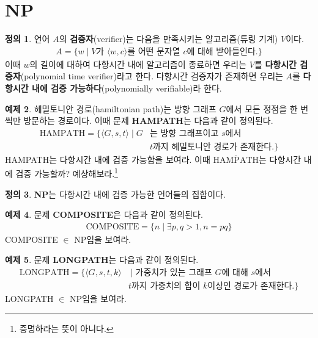 \documentclass[b5paper, 11pt]{book}
\theoremstyle{definition}
\newtheorem{defn}{정의}[chapter]
\newtheorem{ex}[defn]{예제}
\begin{document}
\section{NP}
\begin{defn}
    언어 $A$의 \textbf{검증자}(verifier)는 다음을 만족시키는 알고리즘(튜링 기계) $V$이다.
    \begin{align*}
        A = \{w \;\vert\; V \text{가 } \langle w,c\rangle \text{를 어떤 문자열 } c \text{에 대해 받아들인다.}\}
    \end{align*}
    이때 $w$의 길이에 대하여 다항시간 내에 알고리즘이 종료하면 우리는 $V$를 \textbf{다항시간 검증자}(polynomial time verifier)라고 한다.  다항시간 검증자가 존재하면 우리는 $A$를 \textbf{다항시간 내에 검증 가능하다}(polynomially verifiable)라 한다.
\end{defn}
\begin{ex}
    헤밀토니안 경로(hamiltonian path)는 방향 그래프 $G$에서 모든 정점을 한 번씩만 방문하는 경로이다. 이때 문제 \textbf{HAMPATH}는 다음과 같이 정의된다.
    \begin{align*}
        \text{HAMPATH} = \{\langle G,s,t \rangle \;\vert\; G &\text{는 방향 그래프이고 } s \text{에서 } 
        \\ & t \text{까지 헤밀토니안 경로가 존재한다.}\}
    \end{align*}
    HAMPATH는 다항시간 내에 검증 가능함을 보여라. 이때 $\overline{\text{HAMPATH}}$는 다항시간 내에 검증 가능할까? 예상해보라.\footnote{증명하라는 뜻이 아니다.}
\end{ex}
\begin{defn}
    \textbf{NP}는 다항시간 내에 검증 가능한 언어들의 집합이다.
\end{defn}
\begin{ex}
    문제 \textbf{COMPOSITE}은 다음과 같이 정의된다.
    \begin{align*}
        \text{COMPOSITE} = \{n \;\vert\; \exists p,q > 1, n = pq \}
    \end{align*}
    COMPOSITE $\in$ NP임을 보여라.
\end{ex}
\begin{ex}
    문제 \textbf{LONGPATH}는 다음과 같이 정의된다.
    \begin{align*}
    \text{LONGPATH} = \{ \langle G,s, t, k\rangle & \;\vert\; \text{가중치가 있는 그래프 } G \text{에 대해 } s \text{에서 } \\ 
    & t \text{까지 가중치의 합이 } k \text{이상인 경로가 존재한다.} \}
    \end{align*}
    LONGPATH $\in $ NP임을 보여라. 
\end{ex}
\end{document}
